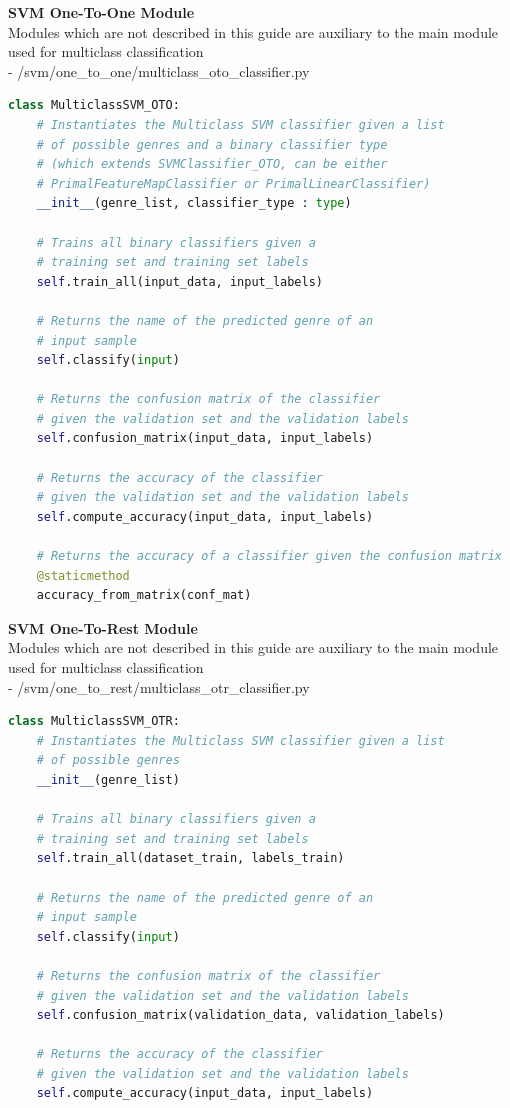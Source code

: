 \documentclass[12pt]{article}
\begin{document}
	\newpage
	\textbf{SVM One-To-One Module}\mbox{}\\
	Modules which are not described in this guide are auxiliary to the main module used for multiclass classification\\ \newline
	- /svm/one\_to\_one/multiclass\_oto\_classifier.py
	\begin{lstlisting}[language=Python]
class MulticlassSVM_OTO:
	# Instantiates the Multiclass SVM classifier given a list
	# of possible genres and a binary classifier type
	# (which extends SVMClassifier_OTO, can be either
	# PrimalFeatureMapClassifier or PrimalLinearClassifier)
	__init__(genre_list, classifier_type : type)
	
	# Trains all binary classifiers given a
	# training set and training set labels
	self.train_all(input_data, input_labels)
	
	# Returns the name of the predicted genre of an
	# input sample
	self.classify(input)
	
	# Returns the confusion matrix of the classifier
	# given the validation set and the validation labels
	self.confusion_matrix(input_data, input_labels)
	
	# Returns the accuracy of the classifier
	# given the validation set and the validation labels
	self.compute_accuracy(input_data, input_labels)
	
	# Returns the accuracy of a classifier given the confusion matrix
	@staticmethod
	accuracy_from_matrix(conf_mat)
	\end{lstlisting}
	\newpage
	\textbf{SVM One-To-Rest Module}\mbox{}\\
	Modules which are not described in this guide are auxiliary to the main module used for multiclass classification\\ \newline
	- /svm/one\_to\_rest/multiclass\_otr\_classifier.py
	\begin{lstlisting}[language=Python]
class MulticlassSVM_OTR:
	# Instantiates the Multiclass SVM classifier given a list
	# of possible genres
	__init__(genre_list)
	
	# Trains all binary classifiers given a
	# training set and training set labels
	self.train_all(dataset_train, labels_train)
	
	# Returns the name of the predicted genre of an
	# input sample
	self.classify(input)
	
	# Returns the confusion matrix of the classifier
	# given the validation set and the validation labels
	self.confusion_matrix(validation_data, validation_labels)
	
	# Returns the accuracy of the classifier
	# given the validation set and the validation labels
	self.compute_accuracy(input_data, input_labels)
	\end{lstlisting}
	\newpage
	\printbibliography
\end{document}
